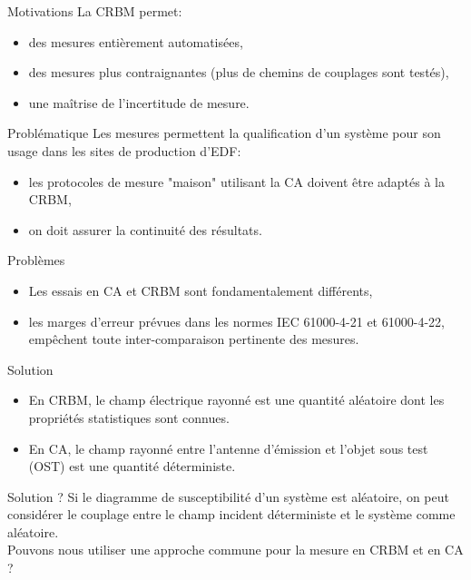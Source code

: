 \documentclass[]{beamer}
\begin{document}
\begin{frame}{Motivations}
La CRBM permet:
\begin{itemize} 
    \item des mesures entièrement automatisées,
    \item des mesures plus contraignantes (plus de chemins de couplages sont testés),
    \item une maîtrise de l'incertitude de mesure.
\end{itemize}
\end{frame}
\begin{frame}{Problématique}
Les mesures permettent la qualification d'un système pour son usage dans les sites de production d'EDF: 
\begin{itemize}
    \item les protocoles de mesure "maison" utilisant la CA doivent être adaptés à la CRBM,
    \item on doit assurer la continuité des résultats.
    \end{itemize}
 \begin{alertblock}{Problèmes}
 \begin{itemize}
 \item Les essais en CA et CRBM sont fondamentalement différents,
\item les marges d'erreur prévues dans les normes IEC 61000-4-21 et 61000-4-22, empêchent toute inter-comparaison pertinente des mesures.
\end{itemize}
 \end{alertblock}
\end{frame}
\begin{frame}{Solution}
\begin{itemize}
    \item En CRBM, le champ électrique rayonné est une quantité aléatoire dont les propriétés statistiques sont connues.
    \item En CA, le champ rayonné entre l'antenne d'émission et l'objet sous test (OST) est une quantité déterministe.
\end{itemize}
 \begin{exampleblock}{Solution ?}
Si le diagramme de susceptibilité d'un système est aléatoire, on peut considérer le couplage entre le champ incident déterministe et le système comme aléatoire.\\ Pouvons nous utiliser une approche commune pour la mesure en CRBM et en CA ?
 \end{exampleblock}
\end{frame}
\end{document}
